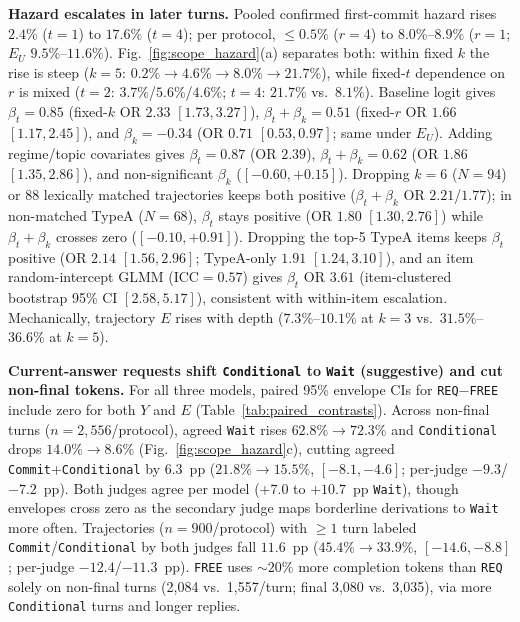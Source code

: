 \documentclass[conference,letterpaper,10pt]{IEEEtran}
\newcommand{\pFREE}{\texttt{FREE}}
\newcommand{\pREQ}{\texttt{REQ}}
\newcommand{\TA}{TypeA}
\begin{document}
\textbf{Hazard escalates in later turns.} Pooled confirmed first-commit hazard rises $2.4\%$ ($t{=}1$) to $17.6\%$ ($t{=}4$); per protocol, ${\le}0.5\%$ ($r{=}4$) to $8.0\%$--$8.9\%$ ($r{=}1$; $E_U$ $9.5\%$--$11.6\%$). Fig.~\ref{fig:scope_hazard}(a) separates both: within fixed $k$ the rise is steep ($k{=}5$: $0.2\%\to4.6\%\to8.0\%\to21.7\%$), while fixed-$t$ dependence on $r$ is mixed ($t{=}2$: $3.7\%$/$5.6\%$/$4.6\%$; $t{=}4$: $21.7\%$ vs.\ $8.1\%$). Baseline logit gives $\beta_t{=}0.85$ (fixed-$k$ OR $2.33$ $[1.73,3.27]$), $\beta_t{+}\beta_k{=}0.51$ (fixed-$r$ OR $1.66$ $[1.17,2.45]$), and $\beta_k{=}{-}0.34$ (OR $0.71$ $[0.53,0.97]$; same under $E_U$). Adding regime/topic covariates gives $\beta_t{=}0.87$ (OR $2.39$), $\beta_t{+}\beta_k{=}0.62$ (OR $1.86$ $[1.35,2.86]$), and non-significant $\beta_k$ ($[-0.60,+0.15]$). Dropping $k{=}6$ ($N{=}94$) or 88 lexically matched trajectories keeps both positive ($\beta_t{+}\beta_k$ OR $2.21$/$1.77$); in non-matched \TA{} ($N{=}68$), $\beta_t$ stays positive (OR $1.80$ $[1.30,2.76]$) while $\beta_t{+}\beta_k$ crosses zero ($[-0.10,+0.91]$). Dropping the top-5 \TA{} items keeps $\beta_t$ positive (OR $2.14$ $[1.56,2.96]$; \TA-only $1.91$ $[1.24,3.10]$), and an item random-intercept GLMM ($\mathrm{ICC}{=}0.57$) gives $\beta_t$ OR $3.61$ (item-clustered bootstrap 95\% CI $[2.58,5.17]$), consistent with within-item escalation. Mechanically, trajectory $E$ rises with depth ($7.3\%$--$10.1\%$ at $k{=}3$ vs.\ $31.5\%$--$36.6\%$ at $k{=}5$).

\textbf{Current-answer requests shift \texttt{Conditional} to \texttt{Wait} (suggestive) and cut non-final tokens.} For all three models, paired 95\% envelope CIs for \pREQ$-$\pFREE{} include zero for both $Y$ and $E$ (Table~\ref{tab:paired_contrasts}). Across non-final turns ($n{=}2{,}556$/protocol), agreed \texttt{Wait} rises $62.8\%\to72.3\%$ and \texttt{Conditional} drops $14.0\%\to8.6\%$ (Fig.~\ref{fig:scope_hazard}c), cutting agreed \texttt{Commit}+\texttt{Conditional} by $6.3$~pp ($21.8\%\to15.5\%$, $[-8.1,-4.6]$; per-judge $-9.3$/$-7.2$~pp). Both judges agree per model ($+7.0$ to $+10.7$~pp \texttt{Wait}), though envelopes cross zero as the secondary judge maps borderline derivations to \texttt{Wait} more often. Trajectories ($n{=}900$/protocol) with ${\ge}1$ turn labeled \texttt{Commit}/\texttt{Conditional} by both judges fall $11.6$~pp ($45.4\%\to33.9\%$, $[-14.6,-8.8]$; per-judge $-12.4$/$-11.3$~pp). \pFREE{} uses ${\sim}20\%$ more completion tokens than \pREQ{} solely on non-final turns (2,084 vs.\ 1,557/turn; final 3,080 vs.\ 3,035), via more \texttt{Conditional} turns and longer replies.
\end{document}

